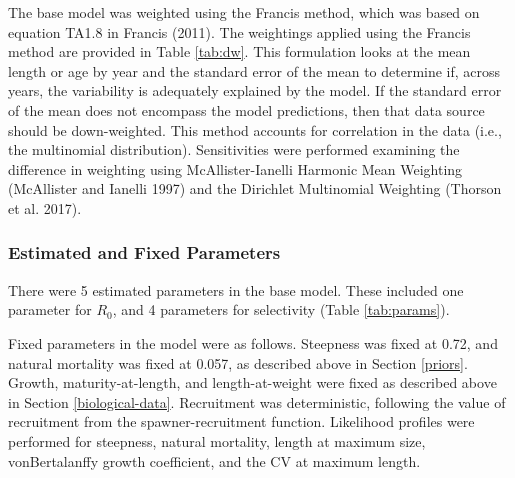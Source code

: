 \documentclass[11pt,
  english,
  a4paper,
]{article}
\begin{document}
\leavevmode\tagmcend\tagstructend\par


The base model was weighted using the Francis method, which was based on equation TA1.8 in Francis {(2011)\leavevmode\tagmcend\tagstructend}. The weightings applied using the Francis method are provided in Table \ref{tab:dw}. This formulation looks at the mean length or age by year and the standard error of the mean to determine if, across years, the variability is adequately explained by the model. If the standard error of the mean does not encompass the model predictions, then that data source should be down-weighted. This method accounts for correlation in the data (i.e., the multinomial distribution). Sensitivities were performed examining the difference in weighting using McAllister-Ianelli Harmonic Mean Weighting {(McAllister and Ianelli 1997)\leavevmode\tagmcend\tagstructend} and the Dirichlet Multinomial Weighting {(Thorson et al. 2017)\leavevmode\tagmcend\tagstructend}.

\leavevmode\tagmcend\tagstructend\par


\hypertarget{estimated-and-fixed-parameters}{%
\subsubsection{Estimated and Fixed Parameters}\label{estimated-and-fixed-parameters}}

\leavevmode\tagmcend\tagstructend


There were 5 estimated parameters in the base model. These included one parameter for {\(R_0\)\leavevmode\tagmcend\tagstructend}, and 4 parameters for selectivity (Table \ref{tab:params}).

\leavevmode\tagmcend\tagstructend\par


Fixed parameters in the model were as follows. Steepness was fixed at 0.72, and natural mortality was fixed at 0.057, as described above in Section \ref{priors}. Growth, maturity-at-length, and length-at-weight were fixed as described above in Section \ref{biological-data}. Recruitment was deterministic, following the value of recruitment from the spawner-recruitment function. Likelihood profiles were performed for steepness, natural mortality, length at maximum size, vonBertalanffy growth coefficient, and the CV at maximum length.
\end{document}
